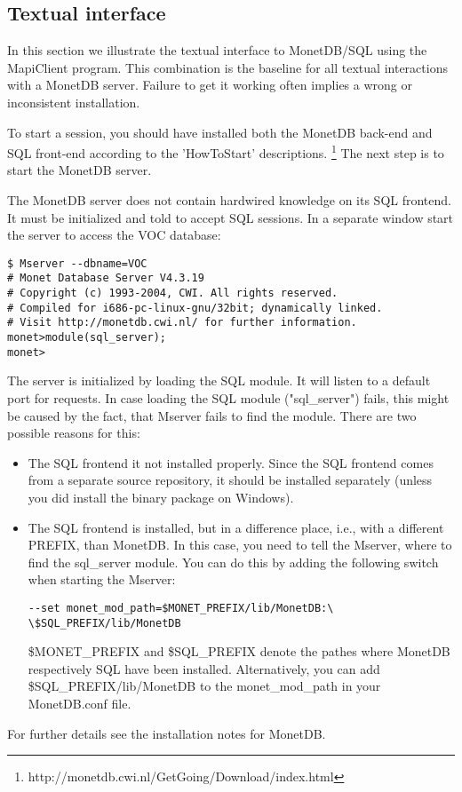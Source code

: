 \documentclass[10pt,twocolumn,fleqn]{article}
\begin{document}
\subsection{Textual interface}
\label{mapi}
In this section we illustrate the textual interface to MonetDB/SQL using the
MapiClient program. This combination is the baseline for all textual
interactions with a MonetDB server.
Failure to get it working often implies a wrong or inconsistent installation.

To start a session, you should have installed both the
MonetDB back-end and SQL front-end according to the 'HowToStart' descriptions.
\footnote{http://monetdb.cwi.nl/GetGoing/Download/index.html}
The next step is to start the MonetDB server.

The MonetDB server does not contain hardwired knowledge on its SQL frontend.
It must be initialized and told to accept SQL sessions. In a separate window
start the server to access the VOC database:

{\footnotesize
\begin{verbatim}
$ Mserver --dbname=VOC 
# Monet Database Server V4.3.19
# Copyright (c) 1993-2004, CWI. All rights reserved.
# Compiled for i686-pc-linux-gnu/32bit; dynamically linked.
# Visit http://monetdb.cwi.nl/ for further information.
monet>module(sql_server);
monet>
\end{verbatim}
}

The server is initialized by loading the SQL module. It will listen
to a default port for requests.
In case loading the SQL module ("sql\_server") fails, this might be caused by
the fact, that Mserver fails to find the module. There are two possible
reasons for this:

\begin{itemize}
\item
The SQL frontend it not installed properly.
Since the SQL frontend comes from a separate source repository,
it should be installed separately (unless you did install the binary package on Windows).
\item The SQL frontend is installed, but in a difference place, i.e., with a different 
PREFIX, than MonetDB.
In this case, you need to tell the Mserver, where to find the sql\_server module.
You can do this by adding the following switch when starting the Mserver:
\begin{verbatim}
--set monet_mod_path=$MONET_PREFIX/lib/MonetDB:\
\$SQL_PREFIX/lib/MonetDB
\end{verbatim}
\$MONET\_PREFIX and \$SQL\_PREFIX denote the pathes where MonetDB respectively SQL have
been installed.
Alternatively, you can add \$SQL\_PREFIX/lib/MonetDB to the monet\_mod\_path in your
 MonetDB.conf file.
\end{itemize}
For further details see the installation notes for MonetDB.
\end{document}
